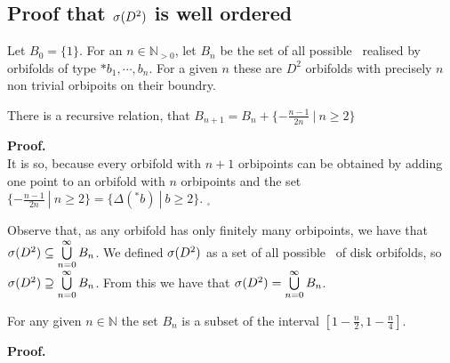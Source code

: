 \subsection{Proof that ${{\sigma}(D^2)}$ is well ordered}

\begin{definition} 
Let $B_0 = \{1\}$.
For an $n \in \mathbb{N}_{>0}$, let $B_n$ be the set of all possible \Eoc\ realised 
by orbifolds of type 
$*b_1, \cdots, b_n$. For a given $n$ these are 
$D^2$ orbifolds with precisely $n$ non trivial orbipoits on their boundry.
\end{definition}


\begin{observation}\label{recursive_relation}
There is a recursive relation, that $B_{n+1}=B_n+\{-\frac{n-1}{2n}\ |\ n\geq 2\}$
\end{observation}
\textbf{Proof.} \\
It is so, because every orbifold with $n+1$ orbipoints can be obtained by adding one point 
to an orbifold with $n$ orbipoints and the set 
$\{-\frac{n-1}{2n}\ |\ n\geq 2\} = \{\Delta(^\ast b)\ |\ b \geq 2\}$. $_\square$


\begin{observation}\label{form_of_a_spectrum}
Observe that, as any orbifold has only finitely many orbipoints, we have that ${{\sigma}(D^2)} \subseteq 
\bigcup\limits^\infty_{n=0}B_n $. We defined ${{\sigma}(D^2)}$ as a set of all possible \Eoc\ of disk 
orbifolds, so ${{\sigma}(D^2)} \supseteq 
\bigcup\limits^\infty_{n=0}B_n $. From this we have that ${{\sigma}(D^2)} = \bigcup\limits^\infty_{n=0}B_n$.
\end{observation}

\begin{lemma}\label{fixed_number_of_orbipoints}
For any given $n \in \mathbb{N}$ the set $B_n$ is a subset of the interval 
$[1-\frac{n}{2}, 1-\frac{n}{4}]$.
\end{lemma}
\textbf{Proof.} \\


